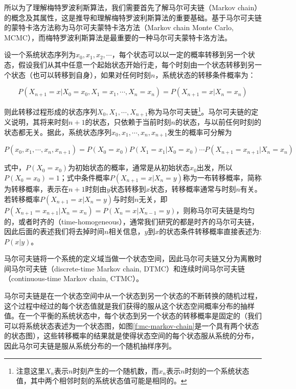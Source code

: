 所以为了理解梅特罗波利斯算法，我们需要首先了解马尔可夫链（Markov chain）的概念及其属性，这是推导和理解梅特罗波利斯算法的重要基础。基于马尔可夫链的蒙特卡洛方法称为马尔可夫蒙特卡洛方法（Markov chain Monte Carlo, MCMC），而梅特罗波利斯算法是最重要的一种马尔可夫蒙特卡洛方法。

设一个系统状态序列为$x_0,x_1,x_2,\cdots$，每个状态可以以一定的概率转移到另一个状态，假设我们从其中任意一个起始状态开始行走，每个时刻由一个状态转移到另一个状态（也可以转移到自身），如果对任何时刻$n$，系统状态的转移条件概率为：

\begin{equation}
	P(X_{n+1}=x|X_0=x_0,X_1=x_1,\cdots,X_n=x_n)=P(X_{n+1}=x|X_n=x_n)
\end{equation}

\noindent 则此转移过程形成的状态序列$X_0,X_1,\cdots,X_{n+1}$称为马尔可夫链\footnote{注意这里$X_n$表示$n$时刻产生的一个随机数，而$x_n$表示$n$时刻的一个系统状态值，其中两个相邻时刻的系统状态值可能是相同的。}。马尔可夫链的定义说明，其将来时刻$n+1$的状态，只依赖于当前时刻$n$的状态，与以前任何时刻的状态都无关。据此，系统状态序列$x_0,x_1,\cdots,x_n,x_{n+1}$发生的概率可分解为

\begin{equation}
	P(x_0,x_1,\cdots,x_n,x_{n+1})=P(X_0=x_0)P(X_1=x_1|X_0=x_0)\cdots P(X_{n+1}=x_{n+1}|X_n=x_n)
\end{equation}

\noindent 式中，$P(X_0=x_0)$为初始状态的概率，通常是从初始状态$x_0$出发，所以$P(X_0=x_0)=1$；式中条件概率$P(X_{n+1}=x|X_n=y)$称为一布转移概率，简称为转移概率，表示在$n+1$时刻由$y$状态转移到$x$状态，转移概率通常与时刻$n$有关。若转移概率$P(X_{n+1}=x|X_n=y)$与时刻$n$无关，即$P(X_{n+1}=x_{n+1}|X_n=x_n)=P(X_n=x|X_{n-1}=y)$，则称马尔可夫链是均匀的，或者时齐的（time-homogeneous），通常我们研究的都是时齐的马尔可夫链，因此后面的表述我们将去掉时间$n$相关信息，$y$到$x$的状态条件转移概率直接表述为: $P(x|y)$。


马尔可夫链将一个系统的定义域当做一个状态空间，因此马尔可夫链又分为离散时间马尔可夫链（discrete-time Markov chain, DTMC）和连续时间马尔可夫链（continuous-time Markov chain, CTMC）。

马尔可夫链是在一个状态空间中从一个状态到另一个状态的不断转换的随机过程，这个过程中经过的每个状态值就是我们获得的服从这个状态空间概率分布的抽样值。在一个平衡的系统状态中，每个状态到另一个状态的转移概率是固定的（我们可以将系统状态表述为一个状态图，如图\ref{f:mc-markov-chain}是一个具有两个状态的状态图），这些转移概率的结果就是使得状态空间的每个状态服从系统的分布，因此马尔可夫链是服从系统分布的一个随机抽样序列。


